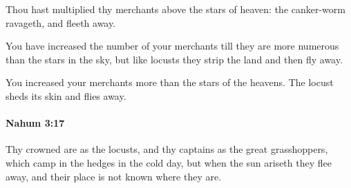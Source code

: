 			\begin{versebox}
					\item[BHS] 
					\item[LXX] 
					\item[ASV] Thou hast multiplied thy merchants above the stars of heaven: the canker-worm ravageth, and fleeth away.
					\item[NIV] You have increased the number of your merchants till they are more numerous than the stars in the sky, but like locusts they strip the land and then fly away.
					\item[NRSV] You increased your merchants more than the stars of the heavens. The locust sheds its skin and flies away.
			\end{versebox}

		\paragraph{Nahum 3:17} %
			\label{NAHUM-3-17}

			Thy crowned are as the locusts, and thy captains as the great grasshoppers, which camp in the hedges in the cold day, but when the sun ariseth they flee away, and their place is not known where they are.

